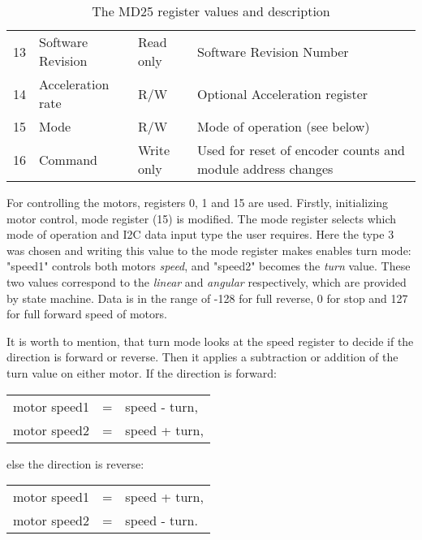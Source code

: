 \begin{table}[!h]
\begin{tabular}{@{}llll@{}}
		13                & Software Revision & Read only           & Software Revision Number                                         \\
		14                & Acceleration rate & R/W                 & Optional Acceleration register                                   \\
		15                & Mode              & R/W                 & Mode of operation (see below)                                    \\
		16                & Command           & Write only          & Used for reset of encoder counts and module address changes      \\ \bottomrule
	\end{tabular}
	\caption{The MD25 register values and description}
	\label{table:md25}
\end{table}

\newpage
For controlling the motors, registers 0, 1 and 15 are used. Firstly, initializing motor control, mode register (15) is modified.
The mode register selects which mode of operation and I2C data input type the user requires. Here the type 3 was chosen and writing this value 
to the mode register makes enables turn mode: "speed1" controls both motors \textit{speed}, and "speed2" becomes the \textit{turn} value. 
These two values correspond to the \textit{linear} and \textit{angular} respectively, which are provided by state machine.
Data is in the range of -128 for full reverse, 0 for stop and 127 for full forward speed of motors.

It is worth to mention, that turn mode looks at the speed register to decide if the direction is forward or reverse. Then it applies a subtraction or addition of the turn value on either motor. If the direction is forward:
\begin{table}[!ht]
	\centering
	\begin{tabular}{lcl}
		motor speed1 & = & speed - turn,\\
		motor speed2 & = & speed + turn,
	\end{tabular}
\end{table}

else the direction is reverse:
\begin{table}[!ht]
	\centering
	\begin{tabular}{lcl}
		motor speed1 & = & speed + turn,\\
		motor speed2 & = & speed - turn.
	\end{tabular}
\end{table}

